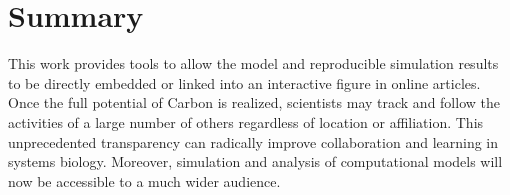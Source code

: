 \chapter{Summary}

This work provides tools to allow the model and reproducible simulation results to be directly embedded or linked into an interactive figure in online articles.
Once the full potential of Carbon is realized, scientists may track and follow the activities of a large number of others regardless of location or affiliation.
This unprecedented transparency can radically improve collaboration and learning in systems biology.
Moreover, simulation and analysis of computational models will now be accessible to a much wider audience.
